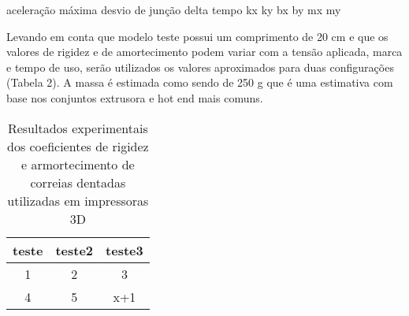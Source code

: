 aceleração máxima
desvio de junção
delta tempo
kx
ky
bx
by
mx
my

Levando em conta que modelo teste possui um comprimento de 20 cm e que os valores de rigidez e de amortecimento podem variar com a tensão aplicada, marca e tempo de uso, serão utilizados os valores aproximados para duas configurações (Tabela 2). A massa é estimada como sendo de 250 g que é uma estimativa com base nos conjuntos extrusora e hot end mais comuns.

\begin{table}
    \begin{center}
    \caption{Resultados experimentais dos coeficientes de rigidez e armortecimento de correias dentadas utilizadas em impressoras 3D}
    \label{tab:parametros_expe_belt}
    \begin{tabular}{c c c}
        teste & teste2 & teste3 \\ \hline
        1 & 2 & 3 \\
        4 & 5 & x+1 \\ \hline
    \end{tabular}
    \end{center}
\end{table}